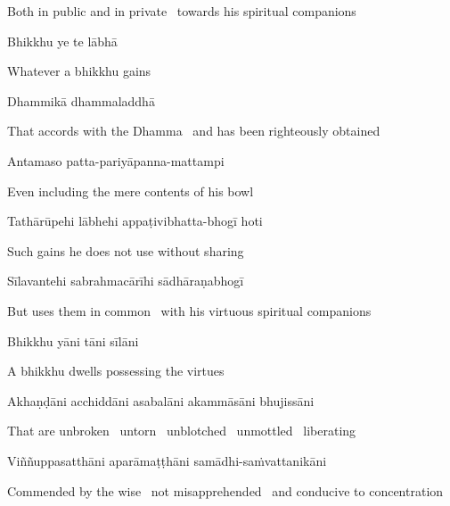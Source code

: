 \begin{cprenglish}
  Both in public and in private \breathmark\ towards his spiritual companions
\end{cprenglish}

Bhikkhu ye te lābhā

\begin{cprenglish}
  Whatever a bhikkhu gains
\end{cprenglish}

Dhammikā dhammaladdhā

\begin{cprenglish}
  That accords with the Dhamma \breathmark\ and has been righteously obtained
\end{cprenglish}

Antamaso patta-pariyāpanna-mattampi

\begin{cprenglish}
  Even including the mere contents of his bowl
\end{cprenglish}

Tathārūpehi lābhehi appaṭivibhatta-bhogī hoti

\begin{cprenglish}
  Such gains he does not use without sharing
\end{cprenglish}

Sīlavantehi sabrahmacārīhi sādhāraṇabhogī

\begin{cprenglish}
  But uses them in common \breathmark\ with his virtuous spiritual companions
\end{cprenglish}

Bhikkhu yāni tāni sīlāni

\begin{cprenglish}
  A bhikkhu dwells possessing the virtues
\end{cprenglish}

Akhaṇḍāni acchiddāni asabalāni akammāsāni bhujissāni

\begin{cprenglish}
  That are unbroken \breathmark\ untorn \breathmark\ unblotched \breathmark\ unmottled \breathmark\ liberating
\end{cprenglish}

Viññuppasatthāni aparāmaṭṭhāni samādhi-saṁvattanikāni

\begin{cprenglish}
  Commended by the wise \breathmark\ not misapprehended \breathmark\ and conducive to concentration
\end{cprenglish}

